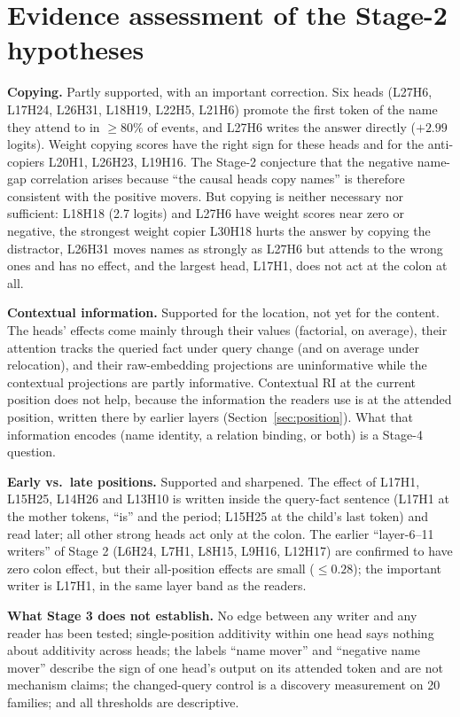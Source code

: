 \documentclass[11pt,a4paper]{article}
\begin{document}
\section{Evidence assessment of the Stage-2 hypotheses}
\label{sec:hyp}
\textbf{Copying.} Partly supported, with an important correction. Six heads
(L27H6, L17H24, L26H31, L18H19, L22H5, L21H6) promote the first token of the name they
attend to in $\ge80\%$ of events, and L27H6 writes the answer directly ($+2.99$
logits).
Weight copying scores have the right sign for these heads and for the anti-copiers
L20H1, L26H23, L19H16. The Stage-2 conjecture that the negative name-gap correlation
arises because ``the causal heads copy names'' is therefore consistent with the
positive movers. But copying is neither necessary nor sufficient: L18H18 (2.7 logits)
and L27H6 have weight scores near zero or negative, the strongest weight copier L30H18
hurts the answer by copying the distractor, L26H31 moves names as strongly as L27H6 but
attends to the wrong ones and has no effect, and the largest head, L17H1, does not act
at the colon at all.

\textbf{Contextual information.} Supported for the location, not yet for the content.
The heads' effects come mainly through their values (factorial, on average), their
attention tracks the queried fact under query change (and on average under relocation),
and their raw-embedding projections
are uninformative while the contextual projections are partly informative. Contextual
RI at the current position does not help, because the information the readers use is
at the attended position, written there by earlier layers (Section~\ref{sec:position}).
What that information encodes (name identity, a relation binding, or both) is a
Stage-4 question.

\textbf{Early vs.\ late positions.} Supported and sharpened. The effect of L17H1,
L15H25, L14H26 and L13H10 is written inside the query-fact sentence (L17H1 at the
mother tokens, ``is'' and the period; L15H25 at the child's last token) and read
later; all other strong heads act only at the colon. The earlier ``layer-6--11
writers'' of Stage 2 (L6H24, L7H1, L8H15, L9H16, L12H17) are confirmed to have zero
colon effect, but their all-position effects are small ($\le0.28$); the important
writer is L17H1, in the same layer band as the readers.

\textbf{What Stage 3 does not establish.} No edge between any writer and any reader has
been tested; single-position additivity within one head says nothing about additivity
across heads; the labels ``name mover'' and ``negative name mover'' describe the sign of
one head's output on its attended token and are not mechanism claims; the changed-query
control is a discovery measurement on 20 families; and all thresholds are descriptive.
\end{document}
